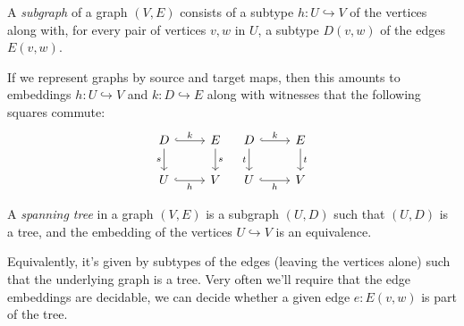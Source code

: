 \begin{definition}
  A \emph{subgraph} of a graph $(V,E)$ consists of a subtype $h : U \hookrightarrow V$
  of the vertices along with, for every pair of vertices $v,w$ in $U$,
  a subtype $D(v,w)$ of the edges $E(v,w)$.
\end{definition}
If we represent graphs by source and target maps, then this amounts to embeddings
$h : U \hookrightarrow V$ and $k : D \hookrightarrow E$ along with witnesses that the
following squares commute:
\[
  \begin{tikzcd}
    D \ar[r,hook,"k"]\ar[d,"s"'] & E \ar[d,"s"] \\
    U \ar[r,hook,"h"'] & V
  \end{tikzcd}\quad
  \begin{tikzcd}
    D \ar[r,hook,"k"]\ar[d,"t"'] & E \ar[d,"t"] \\
    U \ar[r,hook,"h"'] & V
  \end{tikzcd}
\]
\begin{definition}
  A \emph{spanning tree} in a graph $(V,E)$ is a subgraph $(U,D)$
  such that $(U,D)$ is a tree, and the embedding of the vertices
  $U \hookrightarrow V$ is an equivalence.
\end{definition}
Equivalently, it's given by subtypes of the edges (leaving the vertices alone)
such that the underlying graph is a tree.
Very often we'll require that the edge embeddings are decidable,
\ie we can decide whether a given edge $e : E(v,w)$ is part of the tree.

